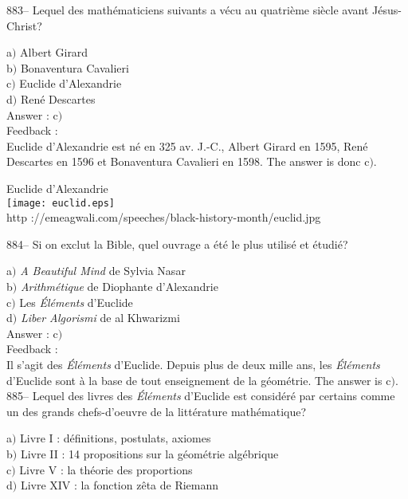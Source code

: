 ﻿\documentclass[letterpaper, 12pt]{article}
\begin{document}
883-- Lequel des math\'ematiciens suivants a v\'ecu au quatri\`eme
si\`ecle avant J\'esus-Christ?

a$)$ Albert Girard \\
b$)$ Bonaventura Cavalieri \\
c$)$ Euclide d'Alexandrie \\
d$)$ Ren\'e Descartes\\

Answer : c$)$\\

Feedback :\\
Euclide d'Alexandrie est n\'e en 325 av. J.-C., Albert Girard en 1595,
Ren\'e Descartes en 1596 et Bonaventura Cavalieri en 1598. The answer is
donc c$)$.\\

        \begin{center}
        Euclide d'Alexandrie\\
    \texttt{[image: euclid.eps]}\\
        {\footnotesize http
://emeagwali.com/speeches/black-history-month/euclid.jpg}
    \end{center}

884-- Si on exclut la Bible, quel ouvrage a \'et\'e le plus
utilis\'e et \'etudi\'e?

a$)$ {\sl A Beautiful Mind} de Sylvia Nasar \\
b$)$ {\sl Arithm\'etique} de Diophante d'Alexandrie \\
c$)$ Les {\sl \'El\'ements} d'Euclide \\
d$)$ {\sl Liber Algorismi} de al Khwarizmi\\

Answer : c$)$\\

Feedback :\\
Il s'agit des {\sl \'El\'ements} d'Euclide. Depuis plus de deux mille ans,
les {\sl \'El\'ements} d'Euclide sont \`a la base de tout enseignement de la
g\'eom\'etrie. The answer is c$)$.\\

885-- Lequel des livres des {\sl \'El\'ements} d'Euclide est
consid\'er\'e par certains comme un des grands chefs-d'oeuvre de la
litt\'erature math\'ematique?

a$)$ Livre I : d\'efinitions, postulats, axiomes \\
b$)$ Livre II : 14 propositions sur la g\'eom\'etrie alg\'ebrique \\
c$)$ Livre V : la th\'eorie des proportions \\
d$)$ Livre XIV : la fonction z\^eta de Riemann \\
\end{document}
